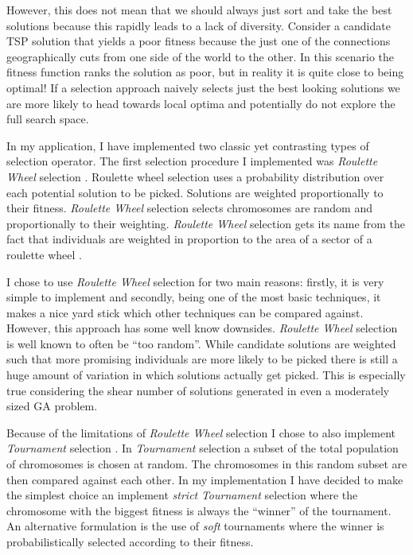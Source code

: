 \documentclass[journal]{IEEEtran}
\begin{document}
However, this does not mean that we should always just sort and take the best solutions because this rapidly leads to a lack of diversity. Consider a candidate TSP solution that yields a poor fitness because the just one of the connections geographically cuts from one side of the world to the other. In this scenario the fitness function ranks the solution as poor, but in reality it is quite close to being optimal! If a selection approach naively selects just the best looking solutions we are more likely to head towards local optima and potentially do not explore the full search space.

In my application, I have implemented two classic yet contrasting types of selection operator. The first selection procedure I implemented was \textit{Roulette Wheel} selection \cite{colin2002genetic}. Roulette wheel selection uses a probability distribution over each potential solution to be picked. Solutions are weighted proportionally to their fitness. \textit{Roulette Wheel} selection selects chromosomes are random and proportionally to their weighting. \textit{Roulette Wheel} selection gets its name from the fact that individuals are weighted in proportion to the area of a sector of a roulette wheel \cite{colin2002genetic}.

I chose to use \textit{Roulette Wheel} selection for two main reasons: firstly, it is very simple to implement and secondly, being one of the most basic techniques, it makes a nice yard stick which other techniques can be compared against. However, this approach has some well know downsides. \textit{Roulette Wheel} selection is well known to often be ``too random''. While candidate solutions are weighted such that more promising individuals are more likely to be picked there is still a huge amount of variation in which solutions actually get picked. This is especially true considering the shear number of solutions generated in even a moderately sized GA problem.

Because of the limitations of \textit{Roulette Wheel} selection I chose to also implement \textit{Tournament} selection \cite{colin2002genetic}. In \textit{Tournament} selection a subset of the total population of chromosomes is chosen at random. The chromosomes in this random subset are then compared against each other. In my implementation I have decided to make the simplest choice an implement \textit{strict} \textit{Tournament} selection where the chromosome with the biggest fitness is always the ``winner'' of the tournament. An alternative formulation is the use of \textit{soft} tournaments where the winner is probabilistically selected according to their fitness.
\end{document}
